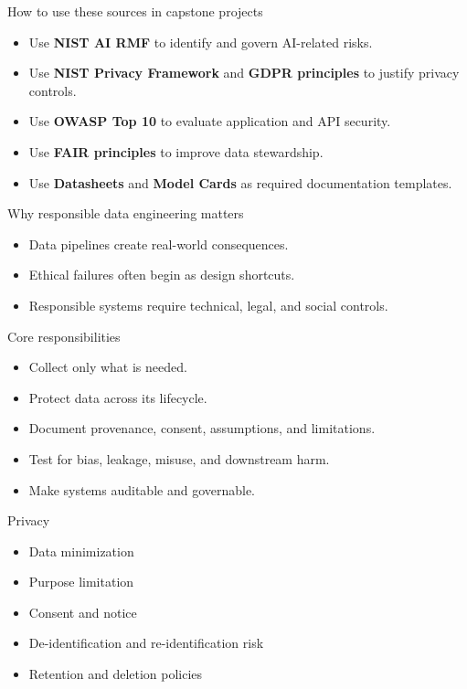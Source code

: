 \documentclass[aspectratio=43,12pt]{beamer}
\begin{document}
\begin{frame}{How to use these sources in capstone projects}
\begin{itemize}
  \item Use \textbf{NIST AI RMF} to identify and govern AI-related risks.
  \item Use \textbf{NIST Privacy Framework} and \textbf{GDPR principles} to justify privacy controls.
  \item Use \textbf{OWASP Top 10} to evaluate application and API security.
  \item Use \textbf{FAIR principles} to improve data stewardship.
  \item Use \textbf{Datasheets} and \textbf{Model Cards} as required documentation templates.
\end{itemize}
\end{frame}

\begin{frame}{Why responsible data engineering matters}
\begin{itemize}
  \item Data pipelines create real-world consequences.
  \item Ethical failures often begin as design shortcuts.
  \item Responsible systems require technical, legal, and social controls.
\end{itemize}
\end{frame}

\begin{frame}{Core responsibilities}
\begin{itemize}
  \item Collect only what is needed.
  \item Protect data across its lifecycle.
  \item Document provenance, consent, assumptions, and limitations.
  \item Test for bias, leakage, misuse, and downstream harm.
  \item Make systems auditable and governable.
\end{itemize}
\end{frame}

\begin{frame}{Privacy}
\begin{itemize}
  \item Data minimization
  \item Purpose limitation
  \item Consent and notice
  \item De-identification and re-identification risk
  \item Retention and deletion policies
\end{itemize}
\end{frame}
\end{document}
